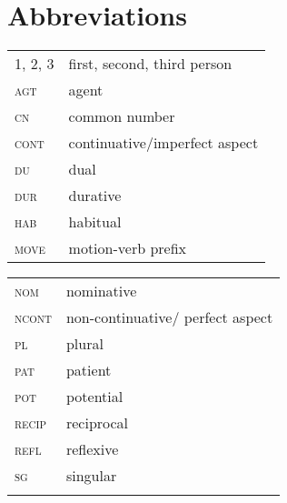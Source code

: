 \documentclass[output=paper]{LSP/langsci}
\begin{document}
\section*{Abbreviations}

\begin{tabularx}{.45\textwidth}{lX}
1, 2, 3 & first, second, third person\\
\textsc{agt} & agent \\
 \textsc{cn} & common number \\
 \textsc{cont} & continuative/imperfect aspect \\
 \textsc{du} & dual \\
 \textsc{dur} & durative \\
 \textsc{hab} & habitual \\
 \textsc{move} & motion-verb prefix \\
\end{tabularx}
\begin{tabularx}{.45\textwidth}{lX}
 \textsc{nom} & nominative \\
 \textsc{ncont} & non-continuative/ perfect aspect \\
 \textsc{pl} & plural \\
 \textsc{pat} & patient\\
 \textsc{pot} & potential \\
 \textsc{recip} & reciprocal \\
 \textsc{refl} & reflexive \\
 \textsc{sg} & singular \\
 \\
\end{tabularx}
 

{\sloppy
\printbibliography[heading=subbibliography,notkeyword=this]
}
\end{document}
